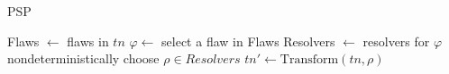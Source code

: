 \begin{algorithm}[t]
  \caption{PSP}
  \label{alg:background:psp}
  \KwOut{$\pi$}
  Flaws $\leftarrow$ flaws in $tn$\;
  $\varphi \leftarrow$ select a flaw in Flaws\;
  Resolvers $\leftarrow$ resolvers for $\varphi$\;
  nondeterministically choose $\rho \in Resolvers$\;
  $tn' \leftarrow \text{Transform}(tn, \rho)$\;
\end{algorithm}





